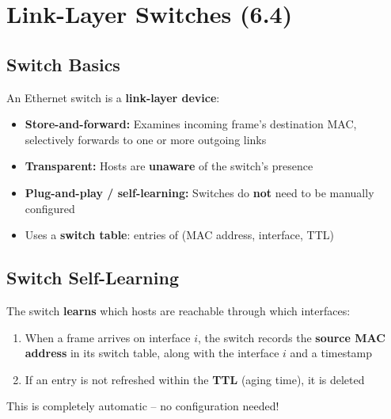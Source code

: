 \section{Link-Layer Switches (6.4)}

\subsection{Switch Basics}

\begin{keybox}
An Ethernet switch is a \textbf{link-layer device}:
\begin{itemize}[noitemsep]
    \item \textbf{Store-and-forward:} Examines incoming frame's destination MAC, selectively forwards to one or more outgoing links
    \item \textbf{Transparent:} Hosts are \textbf{unaware} of the switch's presence
    \item \textbf{Plug-and-play / self-learning:} Switches do \textbf{not} need to be manually configured
    \item Uses a \textbf{switch table}: entries of (MAC address, interface, TTL)
\end{itemize}
\end{keybox}

\subsection{Switch Self-Learning}

\begin{keybox}
The switch \textbf{learns} which hosts are reachable through which interfaces:
\begin{enumerate}[noitemsep]
    \item When a frame arrives on interface $i$, the switch records the \textbf{source MAC address} in its switch table, along with the interface $i$ and a timestamp
    \item If an entry is not refreshed within the \textbf{TTL} (aging time), it is deleted
\end{enumerate}

This is completely automatic -- no configuration needed!
\end{keybox}

\begin{imagebox}
\end{imagebox}

